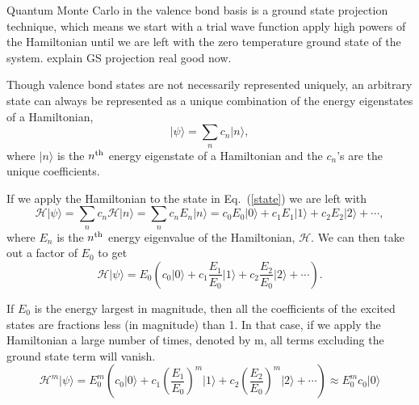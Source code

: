 Quantum Monte Carlo in the valence bond basis is a ground state projection technique, 
which means we start with a trial wave function apply high powers of the Hamiltonian until 
we are left with the zero temperature ground state of the system. 
{\color{red} explain GS projection real good now.}

Though valence bond states are not necessarily represented uniquely, an arbitrary state can 
always be represented as a unique combination of the energy eigenstates of a Hamiltonian,
\begin{equation}
\lvert \psi \rangle = \sum_n c_n \lvert n \rangle,
\label{state}
\end{equation}
where $\lvert n \rangle$ is the $n^{\rm{th}}$ energy eigenstate of a Hamiltonian and the 
$c_n$\!'s are
the unique coefficients.

If we apply the Hamiltonian to the state in Eq.~(\ref{state}) we are left with
\begin{equation}
\mathcal{H}\lvert \psi \rangle = \sum_n c_n \mathcal{H} \lvert n \rangle =
 		\sum_n c_n E_n \lvert n \rangle = 
		c_0 E_0 \lvert 0 \rangle + c_1 E_1 \lvert 1 \rangle +
		c_2 E_2 \lvert 2 \rangle + \cdots,
\end{equation}
where $E_n$ is the $n^{\rm{th}}$ energy eigenvalue of the Hamiltonian, $\mathcal{H}$.
We can then take out a factor of $E_0$ to get
\begin{equation}
\mathcal{H}\lvert \psi \rangle =
		E_0 \left(c_0 \lvert 0 \rangle + c_1 \frac{E_1}{E_0} \lvert 1 \rangle +
		c_2\frac{ E_2}{E_0} \lvert 2 \rangle + \cdots \right).
\end{equation}

If $E_0$ is the energy largest in magnitude, then all the coefficients
of the excited states are fractions less (in magnitude) than 1.  
In that case, if we apply the Hamiltonian a large number of times, denoted by m, all terms excluding
the ground state term will vanish.
\begin{equation}
\mathcal{H}^m\lvert \psi \rangle =
		E_0^m \left(c_0 \lvert 0 \rangle + 
		c_1 \left(\frac{E_1}{E_0}\right)^m \lvert 1 \rangle +
		c_2\left(\frac{ E_2}{E_0}\right)^m \lvert 2 \rangle + \cdots \right)
		\approx E_0^m c_0 \lvert 0 \rangle
\end{equation}

